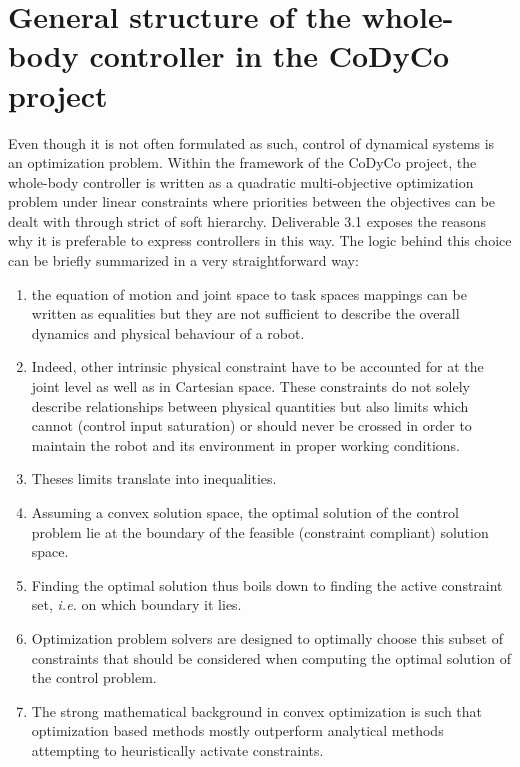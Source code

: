 \documentclass[12pt,a4paper,twoside]{article}
\begin{document}
\section{General structure of the whole-body controller in the CoDyCo project}

Even though it is not often formulated as such, control of dynamical systems is an optimization problem. Within the framework of the CoDyCo project, the whole-body controller is written as a quadratic multi-objective optimization problem under linear constraints where priorities between the objectives can be dealt with through strict of soft hierarchy. Deliverable 3.1 \cite{deliverable31} exposes the reasons why it is preferable to express controllers in this way. The logic behind this choice can be briefly summarized in a very straightforward way:
\begin{enumerate}
\item the equation of motion and joint space to task spaces mappings can be written as equalities but they are not sufficient to describe the overall dynamics and physical behaviour of a robot.
\item Indeed, other intrinsic physical constraint have to be accounted for at the joint level as well as in Cartesian space. These constraints do not solely describe relationships between physical quantities but also limits which cannot (control input saturation) or should never be crossed in order to maintain the robot and its environment in proper working conditions.
\item Theses limits translate into inequalities.
\item Assuming a convex solution space, the optimal solution of the control problem lie at the boundary of the feasible (constraint compliant) solution space.
\item Finding the optimal solution thus boils down to finding the active constraint set, \textit{i.e.} on which boundary it lies.
\item Optimization problem solvers are designed to optimally choose this subset of constraints that should be considered when computing the optimal solution of the control problem.
\item The strong mathematical background in convex optimization is such that optimization based methods mostly outperform analytical methods attempting to heuristically activate constraints.
\end{enumerate}
\end{document}
